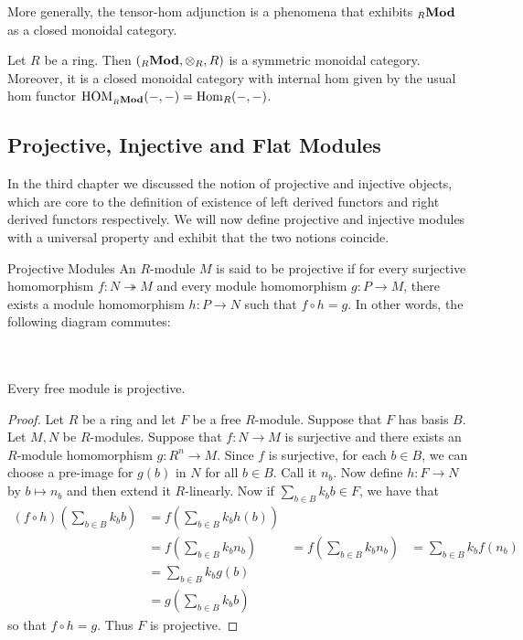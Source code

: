 \documentclass[a4paper]{article}
\begin{document}
More generally, the tensor-hom adjunction is a phenomena that exhibits ${_R}\bold{Mod}$  as a closed monoidal category. 

\begin{thm}{}{} Let $R$ be a ring. Then $({_R}\bold{Mod},\otimes_R,R)$ is a symmetric monoidal category. Moreover, it is a closed monoidal category with internal hom given by the usual hom functor $\text{HOM}_{{_R}\bold{Mod}}(-,-)=\operatorname{Hom}_R(-,-)$. 
\end{thm}

\subsection{Projective, Injective and Flat Modules}
In the third chapter we discussed the notion of projective and injective objects, which are core to the definition of existence of left derived functors and right derived functors respectively. We will now define projective and injective modules with a universal property and exhibit that the two notions coincide. 

\begin{defn}{Projective Modules}{} An $R$-module $M$ is said to be projective if for every surjective homomorphism $f:N\twoheadrightarrow M$ and every module homomorphism $g:P\to M$, there exists a module homomorphism $h:P\to N$ such that $f\circ h=g$. In other words, the following diagram commutes: \\~\\
 \\
\end{defn}

\begin{lmm}{}{} Every free module is projective. \tcbline
\begin{proof}
Let $R$ be a ring and let $F$ be a free $R$-module. Suppose that $F$ has basis $B$. Let $M,N$ be $R$-modules. Suppose that $f:N\to M$ is surjective and there exists an $R$-module homomorphism $g:R^n\to M$. Since $f$ is surjective, for each $b\in B$, we can choose a pre-image for $g(b)$ in $N$ for all $b\in B$. Call it $n_b$. Now define $h:F\to N$ by $b\mapsto n_b$ and then extend it $R$-linearly. Now if $\sum_{b\in B}k_bb\in F$, we have that 
\begin{align*}
(f\circ h)\left(\sum_{b\in B}k_bb\right)&=f\left(\sum_{b\in B}k_bh(b)\right)\\
&=f\left(\sum_{b\in B}k_bn_b\right)
&=f\left(\sum_{b\in B}k_bn_b\right)
&=\sum_{b\in B}k_bf(n_b)\\
&=\sum_{b\in B}k_bg(b)\\
&=g\left(\sum_{b\in B}k_bb\right)
\end{align*}
so that $f\circ h=g$. Thus $F$ is projective. 
\end{proof}
\end{lmm}
\end{document}
